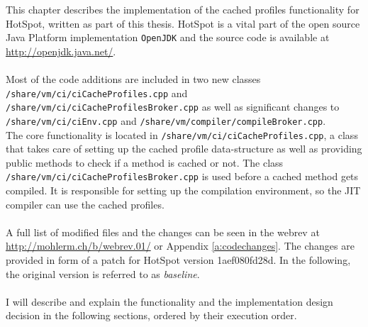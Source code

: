 This chapter describes the implementation of the cached profiles functionality for HotSpot, written as part of this thesis.
HotSpot is a vital part of the open source Java Platform implementation \texttt{OpenJDK} and the source code is available at \url{http://openjdk.java.net/}.
\\\\
Most of the code additions are included in two new classes \texttt{/share/vm/ci/ciCacheProfiles.cpp} and \texttt{/share/vm/ci/ciCacheProfilesBroker.cpp} as well as significant changes to \\\texttt{/share/vm/ci/ciEnv.cpp} and \texttt{/share/vm/compiler/compileBroker.cpp}.
\\
The core functionality is located in \texttt{/share/vm/ci/ciCacheProfiles.cpp}, a class that takes care of setting up the cached profile data-structure as well as providing public methods to check if a method is cached or not. The class \texttt{/share/vm/ci/ciCacheProfilesBroker.cpp} is used before a cached method gets compiled. It is responsible for setting up the compilation environment, so the JIT compiler can use the cached profiles.
\\\\
A full list of modified files and the changes can be seen in the webrev at \url{http://mohlerm.ch/b/webrev.01/} or Appendix \ref{a:codechanges}.
The changes are provided in form of a patch for HotSpot version 1aef080fd28d. In the following, the original version is referred to as \textit{baseline}.
\\\\
I will describe and explain the functionality and the implementation design decision in the following sections, ordered by their execution order.

